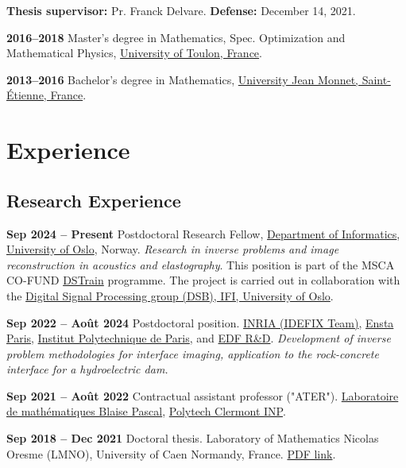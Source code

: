 \documentclass[10pt]{article}
\begin{document}
\textbf{Thesis supervisor:} Pr. Franck Delvare. \quad \textbf{Defense:} December 14, 2021.


\textbf{2016--2018} \quad Master's degree in Mathematics, Spec. Optimization and Mathematical Physics, \href{https://www.univ-tln.fr/}{University of Toulon, France}.  

\textbf{2013--2016} \quad Bachelor's degree in Mathematics, \href{https://www.univ-st-etienne.fr/}{University Jean Monnet, Saint-Étienne, France}.  

\section{Experience}
\subsection{Research Experience}

\textbf{Sep 2024 -- Present} \quad Postdoctoral Research Fellow,  
\href{https://www.mn.uio.no/ifi/english/}{Department of Informatics},  
\href{https://www.uio.no/}{University of Oslo}, Norway.   \textit{Research in inverse problems and image reconstruction in acoustics and elastography}. 
This position is part of the MSCA CO-FUND \href{https://www.uio.no/dscience/english/dstrain/postdoctoral-fellows/aziz-boukraa.html}{DSTrain} programme.  The project is carried out in collaboration with the  
\href{https://www.mn.uio.no/ifi/english/research/groups/dsp/}{Digital Signal Processing group (DSB), IFI, University of Oslo}. 



\textbf{Sep 2022 -- Août 2024} \quad Postdoctoral position.  
\href{https://uma.ensta-paris.fr/idefix/}{INRIA (IDEFIX Team)}, \href{https://www.ensta-paris.fr/}{Ensta Paris}, \href{https://www.ip-paris.fr/}{Institut Polytechnique de Paris}, and \href{https://www.edf.fr/}{EDF R\&D}.  
\textit{Development of inverse problem methodologies for interface imaging, application to the rock-concrete interface for a hydroelectric dam.}

\medskip

\textbf{Sep 2021 -- Août 2022} \quad Contractual assistant professor ("ATER").  
\href{https://lmbp.uca.fr/}{Laboratoire de mathématiques Blaise Pascal}, \href{http://polytech.univ-bpclermont.fr/}{Polytech Clermont INP}.  

\medskip

\textbf{Sep 2018 -- Dec 2021} \quad Doctoral thesis.  
Laboratory of Mathematics Nicolas Oresme (LMNO), University of Caen Normandy, France.  
\href{https://tel.archives-ouvertes.fr/tel-03526539}{PDF link}.
\end{document}
